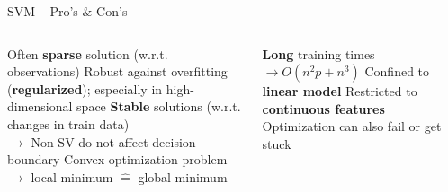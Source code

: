 \begin{frame2}{SVM -- Pro's \& Con's}

\begin{columns}[T, totalwidth=\textwidth]
  \begin{column}{0.5\textwidth}
    \begin{itemize}
      \positem Often \textbf{sparse} solution (w.r.t. observations)
      \positem Robust against overfitting (\textbf{regularized}); especially in 
      high-dimensional space
      \positem \textbf{Stable} solutions (w.r.t. changes in train data)\\
      $\rightarrow$ Non-SV do not affect decision boundary
      \positem Convex optimization problem \\
      $\rightarrow$ local minimum $\hat{=}$ global minimum
    \end{itemize}
    
  \end{column}

  \begin{column}{0.5\textwidth}
    \begin{itemize}
      \negitem \textbf{Long} training times $\rightarrow O(n^2 p + n^3)$
      \negitem Confined to \textbf{linear model}
      \negitem Restricted to \textbf{continuous features}
      \negitem Optimization can also fail or get stuck
    \end{itemize}

  \end{column}
\end{columns}

\end{frame2}

